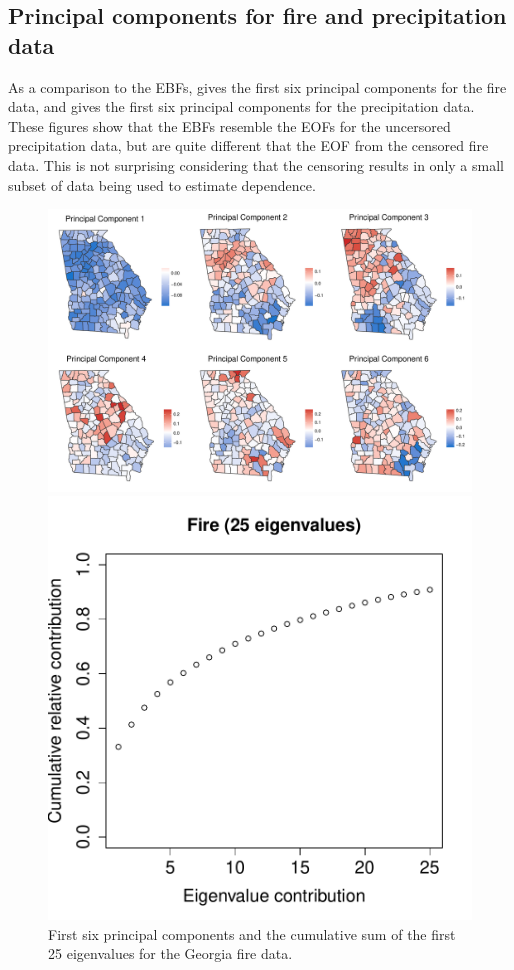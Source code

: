 \documentclass[11pt]{article}
\begin{document}
\subsection{Principal components for fire and precipitation data} \label{eba:pca}
As a comparison to the EBFs,  gives the first six principal components for the fire data, and  gives the first six principal components for the precipitation data.
These figures show that the EBFs resemble the EOFs  for the uncersored precipitation data, but are quite different that the EOF from the censored fire data.
This is not surprising considering that the censoring results in only a small subset of data being used to estimate dependence.
\begin{figure}[htbp] %
  \centering
  \includegraphics[width=\linewidth]{plots/fire-eig-panel.pdf}

  \includegraphics[width=0.35\linewidth]{plots/firelambda-25.pdf}
  \caption{First six principal components and the cumulative sum of the first 25 eigenvalues for the Georgia fire data.}
  \label{ebfig:fire-eigpanel}
\end{figure}

\end{document}
